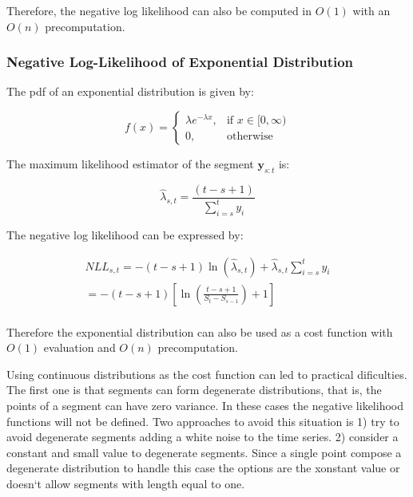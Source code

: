 Therefore, the negative log likelihood can also be computed in $O(1)$ with an $O(n)$ precomputation.

\subsubsection{Negative Log-Likelihood of Exponential Distribution}

The pdf of an exponential distribution is given by:

\begin{equation}
    f(x) = 
    \begin{cases}
        \lambda e^{- \lambda x}, & \text{if } x \in [0, \infty) \\
        0, & \text{otherwise}
    \end{cases}
\end{equation}

The maximum likelihood estimator of the segment $\mathbf{y}_{s : t}$ is:

\begin{equation}
    \widehat{\lambda}_{s, t} = \frac{(t - s + 1)}{\sum \limits_{i = s}^{t} y_{i}}
\end{equation}

The negative log likelihood can be expressed by:

\begin{equation}
    \begin{aligned}
        NLL_{s, t} = - (t - s + 1) \ln(\widehat{\lambda}_{s, t}) + \widehat{\lambda}_{s, t} \sum \limits_{i = s}^{t} y_{i} \\
        = - (t - s + 1) \left[ \ln \left( \frac{t - s + 1}{S_{t} - S_{s - 1}} \right) + 1 \right] \\
    \end{aligned}
\end{equation}

Therefore the exponential distribution can also be used as a cost function with $O(1)$ evaluation and $O(n)$ precomputation.

Using continuous distributions as the cost function can led to practical dificulties. The first one is that segments can form degenerate distributions, that is, the points of a segment can have zero variance. In these cases the negative likelihood functions will not be defined. Two approaches to avoid this situation is 1) try to avoid degenerate segments adding a white noise to the time series. 2) consider a constant and small value to degenerate segments. Since a single point compose a degenerate distribution to handle this case the options are the xonstant value or doesn`t allow segments with length equal to one.

